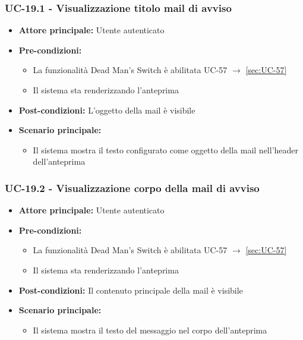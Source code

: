 \documentclass[a4paper,12pt]{article}
\begin{document}
\subsubsection{UC-19.1 - Visualizzazione titolo mail di avviso} \label{subsec:UC-19.1}
\begin{itemize}
    \item \textbf{Attore principale:} Utente autenticato
    \item \textbf{Pre-condizioni:}
    \begin{itemize}
        \item La funzionalità Dead Man's Switch è abilitata UC-57 $\rightarrow$ \ref{sec:UC-57}
        \item Il sistema sta renderizzando l'anteprima
    \end{itemize}
    \item \textbf{Post-condizioni:} L'oggetto della mail è visibile
    \item \textbf{Scenario principale:} 
    \begin{itemize}
        \item Il sistema mostra il testo configurato come oggetto della mail nell'header dell'anteprima
    \end{itemize}
\end{itemize}

\subsubsection{UC-19.2 - Visualizzazione corpo della mail di avviso} \label{subsec:UC-19.2}
\begin{itemize}
    \item \textbf{Attore principale:} Utente autenticato
    \item \textbf{Pre-condizioni:}
    \begin{itemize}
        \item La funzionalità Dead Man's Switch è abilitata UC-57 $\rightarrow$ \ref{sec:UC-57}
        \item Il sistema sta renderizzando l'anteprima
    \end{itemize}
    \item \textbf{Post-condizioni:} Il contenuto principale della mail è visibile
    \item \textbf{Scenario principale:} 
    \begin{itemize}
        \item Il sistema mostra il testo del messaggio nel corpo dell'anteprima
    \end{itemize}
\end{itemize}
\end{document}

